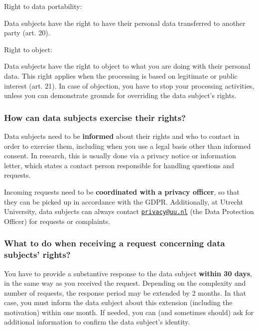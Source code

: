 \documentclass[
]{book}
\begin{document}
Right to data portability:

Data subjects have the right to have their personal data transferred to
another party (art. 20).

Right to object:

Data subjects have the right to object to what you are doing with their
personal data. This right applies when the processing is based on legitimate
or public interest (art. 21).
In case of objection, you have to stop your processing activities, unless
you can demonstrate grounds for overriding the data subject's rights.

\hypertarget{how-can-data-subjects-exercise-their-rights}{%
\subsubsection{How can data subjects exercise their rights?}\label{how-can-data-subjects-exercise-their-rights}}

Data subjects need to be \textbf{informed} about their rights and who to contact in
order to exercise them, including when you use a legal basis other than informed
consent. In research, this is usually done via a
privacy notice or information letter, which states
a contact person responsible for handling questions and requests.

Incoming requests need to be \textbf{coordinated with a privacy officer}, so that
they can be picked up in accordance with the GDPR. Additionally, at Utrecht
University, data subjects can always contact
\href{mailto:privacy@uu.nl}{\nolinkurl{privacy@uu.nl}} (the Data Protection Officer) for
requests or complaints.

\hypertarget{what-to-do-when-receiving-a-request-concerning-data-subjects-rights}{%
\subsubsection{What to do when receiving a request concerning data subjects' rights?}\label{what-to-do-when-receiving-a-request-concerning-data-subjects-rights}}

You have to provide a substantive response to the data subject \textbf{within 30 days},
in the same way as you received the request. Depending on the complexity and
number of requests, the response period may be extended by 2 months. In that
case, you must inform the data subject about this extension (including the
motivation) within one month. If needed, you can (and sometimes should) ask for
additional information to confirm the data subject's identity.
\end{document}
